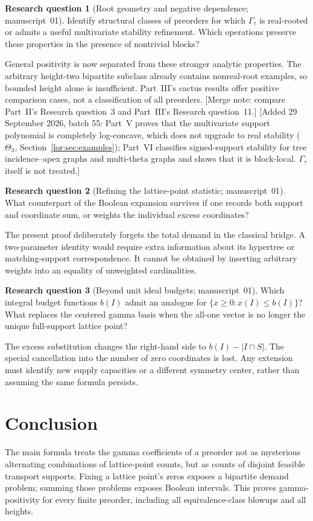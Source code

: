 \documentclass[11pt]{article}
\numberwithin{equation}{section}
\theoremstyle{definition}
\newtheorem{question}{Research question}%
\begin{document}
\begin{question}[Root geometry and negative dependence; manuscript~01]\label{lor:hq:rootgeom}%
Identify structural classes of preorders for which $\Gamma_\tau$ is
real-rooted or admits a useful multivariate stability refinement. Which
operations preserve these properties in the presence of nontrivial blocks?
\end{question}
General positivity is now separated from these stronger analytic properties.
The arbitrary height-two bipartite subclass already contains nonreal-root
examples, so bounded height alone is insufficient. Part~III's cactus
results offer positive comparison cases, not a classification of all
preorders. [Merge note: compare Part~II's Research question~3 and Part~III's
Research question~11.]
[Added 29 September 2026, batch 55: Part~V proves that the multivariate
support polynomial is completely log-concave, which does not upgrade to
real stability ($\Theta_3$, Section~\ref{lor:sec:examples}); Part~VI
classifies signed-support stability for tree incidence--apex graphs and
multi-theta graphs and shows that it is block-local. $\Gamma_\tau$ itself is
not treated.]

\begin{question}[Refining the lattice-point statistic; manuscript~01]
What counterpart of the Boolean expansion survives if one records both
support and coordinate sum, or weights the individual excess coordinates?
\end{question}
The present proof deliberately forgets the total demand in the classical
bridge. A two-parameter identity would require extra information about its
hypertree or matching-support correspondence. It cannot be obtained by
inserting arbitrary weights into an equality of unweighted cardinalities.

\begin{question}[Beyond unit ideal budgets; manuscript~01]\label{gam:gv:q:last}
Which integral budget functions $b(I)$ admit an analogue for
$\{x\ge0:x(I)\le b(I)\}$? What replaces the centered gamma basis when the
all-one vector is no longer the unique full-support lattice point?
\end{question}
The excess substitution changes the right-hand side to
$b(I)-|I\cap S|$. The special cancellation into the number of zero
coordinates is lost. Any extension must identify new supply capacities or
a different symmetry center, rather than assuming the same formula persists.

\section{Conclusion}\label{gam:sec:conclusion}
The main formula treats the gamma coefficients of a preorder not as
mysterious alternating combinations of lattice-point counts, but as counts
of disjoint feasible transport supports. Fixing a lattice point's zeros
exposes a bipartite demand problem; summing those problems exposes Boolean
intervals. This proves gamma-positivity for every finite preorder, including
all equivalence-class blowups and all heights.
\end{document}
